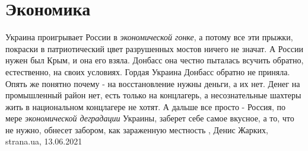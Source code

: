  
 
 
 
 
\chapter{Экономика}

Украина проигрывает России в \emph{экономической гонке}, а потому все эти прыжки,
покраски в патриотический цвет разрушенных мостов ничего не значат. А России
нужен был Крым, и она его взяла. Донбасс она честно пыталась всучить обратно,
естественно, на своих условиях. Гордая Украина Донбасс обратно не приняла.
Опять же понятно почему - на восстановление нужны деньги, а их нет. Денег на
промышленный район нет, есть только на концлагерь, а несознательные шахтеры
жить в национальном концлагере не хотят.  А дальше все просто - Россия, по мере
\emph{экономической деградации} Украины, заберет себе самое вкусное, а то, что не
нужно, обнесет забором, как зараженную местность
, 
Денис Жарких, strana.ua, 13.06.2021

